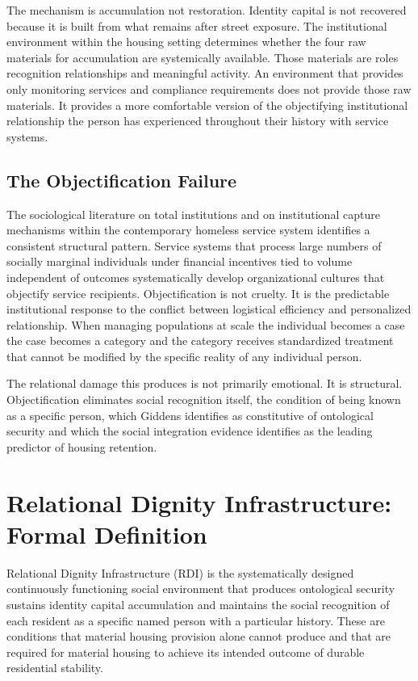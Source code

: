 \documentclass[12pt, letterpaper]{article}
\begin{document}
The mechanism is accumulation not restoration. Identity capital is not recovered because it is built from what remains after street exposure. The institutional environment within the housing setting determines whether the four raw materials for accumulation are systemically available. Those materials are roles recognition relationships and meaningful activity. An environment that provides only monitoring services and compliance requirements does not provide those raw materials. It provides a more comfortable version of the objectifying institutional relationship the person has experienced throughout their history with service systems.

\subsection{The Objectification Failure}

The sociological literature on total institutions \citep{goffman_1961} and on institutional capture mechanisms within the contemporary homeless service system \citep{roebuck_2022} identifies a consistent structural pattern. Service systems that process large numbers of socially marginal individuals under financial incentives tied to volume independent of outcomes systematically develop organizational cultures that objectify service recipients. Objectification is not cruelty. It is the predictable institutional response to the conflict between logistical efficiency and personalized relationship. When managing populations at scale the individual becomes a case the case becomes a category and the category receives standardized treatment that cannot be modified by the specific reality of any individual person.

The relational damage this produces is not primarily emotional. It is structural. Objectification eliminates social recognition itself, the condition of being known as a specific person, which Giddens identifies as constitutive of ontological security and which the social integration evidence identifies as the leading predictor of housing retention.

\clearpage
\section{Relational Dignity Infrastructure: Formal Definition}

Relational Dignity Infrastructure (RDI) is the systematically designed continuously functioning social environment that produces ontological security sustains identity capital accumulation and maintains the social recognition of each resident as a specific named person with a particular history. These are conditions that material housing provision alone cannot produce and that are required for material housing to achieve its intended outcome of durable residential stability.
\end{document}
